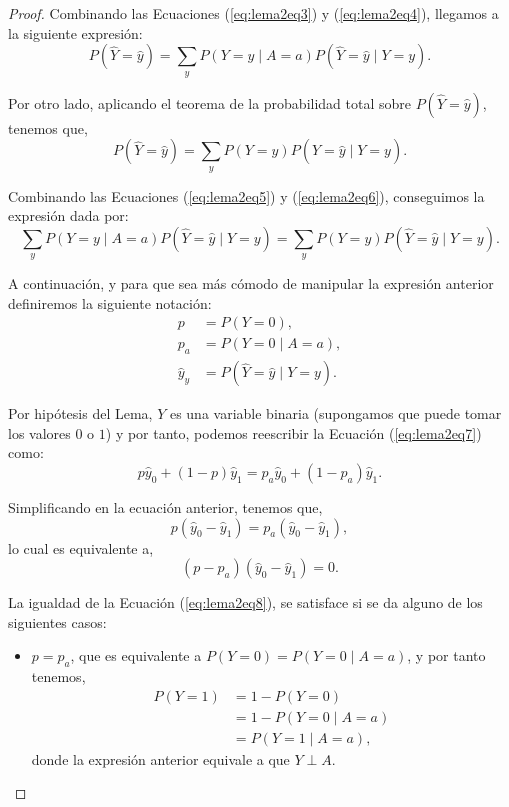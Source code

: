 \documentclass[oneside,openright,titlepage,numbers=noenddot,openany,headinclude,footinclude=true,
cleardoublepage=empty,abstractoff,BCOR=5mm,paper=a4,fontsize=12pt,main=spanish]{scrreprt}
\begin{document}
\begin{proof}
Combinando las Ecuaciones (\ref{eq:lema2eq3}) y (\ref{eq:lema2eq4}), llegamos a la siguiente expresión:
\begin{equation}\label{eq:lema2eq5}
P(\hat{Y}=\hat{y}) = \sum_{y} P(Y=y \mid A=a)P(\hat{Y}=\hat{y} \mid Y=y).
\end{equation}

Por otro lado, aplicando el teorema de la probabilidad total sobre $P(\hat{Y}=\hat{y})$, tenemos que,
\begin{equation}\label{eq:lema2eq6}
P(\hat{Y}=\hat{y}) = \sum_{y} P(Y=y) P(\hat{Y}=\hat{y} \mid Y=y).
\end{equation}

Combinando las Ecuaciones (\ref{eq:lema2eq5}) y (\ref{eq:lema2eq6}), conseguimos la expresión dada por:
\begin{equation}\label{eq:lema2eq7}
\sum_{y} P(Y=y \mid A=a)P(\hat{Y}=\hat{y} \mid Y=y) = \sum_{y} P(Y=y) P(\hat{Y}=\hat{y} \mid Y=y).
\end{equation}

A continuación, y para que sea más cómodo de manipular la expresión anterior definiremos la siguiente notación:
\begin{equation*}
\begin{split}
    p&=P(Y=0),\\
    p_a&=P(Y=0 \mid A=a),\\
    \hat{y}_{y}&=P(\hat{Y}=\hat{y} \mid Y=y).
\end{split}
\end{equation*}

Por hipótesis del Lema, $Y$ es una variable binaria (supongamos que puede tomar los valores $0$ o $1$) y por tanto, podemos reescribir la Ecuación (\ref{eq:lema2eq7}) como:
\begin{equation*}
p\hat{y}_0+(1-p)\hat{y}_1=p_a\hat{y}_0+(1-p_a)\hat{y}_1.
\end{equation*}

Simplificando en la ecuación anterior, tenemos que,
\begin{equation*}
p(\hat{y}_0-\hat{y}_1)=p_a(\hat{y}_0-\hat{y}_1),
\end{equation*}
lo cual es equivalente a,
\begin{equation}\label{eq:lema2eq8}
(p-p_a)(\hat{y}_0-\hat{y}_1)=0.
\end{equation}

La igualdad de la Ecuación (\ref{eq:lema2eq8}), se satisface si se da alguno de los siguientes casos:

\begin{itemize}
    \item $p=p_a$, que es equivalente a $P(Y=0)=P(Y=0 \mid A=a)$, y por tanto tenemos,
    \begin{equation*}
    \begin{split}
    P(Y=1)&=1-P(Y=0)\\
    &=1-P(Y=0 \mid A=a)\\
    &=P(Y=1 \mid A=a),
    \end{split}
    \end{equation*}
    donde la expresión anterior equivale a que $Y\perp A$.\\
    

\end{itemize}
\end{proof}
\end{document}
